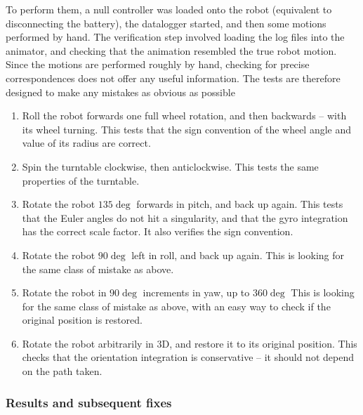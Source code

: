\documentclass[main.tex]{subfiles}
\begin{document}
		To perform them, a null controller was loaded onto the robot (equivalent to disconnecting the battery), the datalogger started, and then some motions performed by hand.
		The verification step involved loading the log files into the animator, and checking that the animation resembled the true robot motion.
		Since the motions are performed roughly by hand, checking for precise correspondences does not offer any useful information.
		The tests are therefore designed to make any mistakes as obvious as possible

		\begin{enumerate}
			\item \label{sensor-test-wheel}
				Roll the robot forwards one full wheel rotation, and then backwards -- with its wheel turning.
				This tests that the sign convention of the wheel angle and value of its radius are correct.

			\item \label{sensor-test-tt}
				Spin the turntable clockwise, then anticlockwise.
				This tests the same properties of the turntable.

			\item \label{sensor-test-pitch}
				Rotate the robot $135\deg$ forwards in pitch, and back up again.
				This tests that the Euler angles do not hit a singularity, and that the gyro integration has the correct scale factor.
				It also verifies the sign convention.

			\item \label{sensor-test-roll}

			    Rotate the robot $90\deg$ left in roll, and back up again.
			    This is looking for the same class of mistake as above.

			\item \label{sensor-test-yaw}
				Rotate the robot in $90\deg$ increments in yaw, up to $360\deg$
			    This is looking for the same class of mistake as above, with an easy way to check if the original position is restored.

			\item \label{sensor-test-free}
			    Rotate the robot arbitrarily in 3D, and restore it to its original position.
			    This checks that the orientation integration is conservative -- it should not depend on the path taken.
		\end{enumerate}

		\subsubsection{Results and subsequent fixes}
\end{document}
